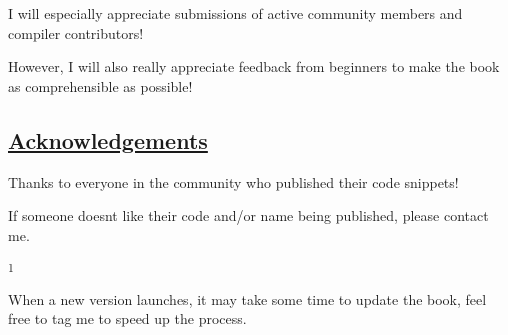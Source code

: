 I will especially appreciate submissions of active community members and
compiler contributors!

However, I will also really appreciate feedback from beginners to make
the book as comprehensible as possible!

\subsection{\texorpdfstring{\hyperref[acknowledgements]{Acknowledgements}}{Acknowledgements}}\label{acknowledgements}

Thanks to everyone in the community who published their code snippets!

If someone doesn\textquotesingle t like their code and/or name being
published, please contact me.

\label{1}
\textsuperscript{1}

When a new version launches, it may take some time to update the book,
feel free to tag me to speed up the process.
